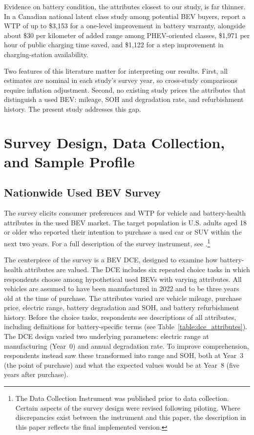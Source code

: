 \documentclass[a4paper,fleqn]{cas-sc}   %
\begin{document}
Evidence on battery condition, the attributes closest to our study, is far thinner. In a Canadian national latent class study among potential BEV buyers, \textcite{fergusonHowOpenAre2018} report a WTP of up to \$3,153 for a one-level improvement in battery warranty, alongside about \$30 per kilometer of added range among PHEV-oriented classes, \$1,971 per hour of public charging time saved, and \$1,122 for a step improvement in charging-station availability.

Two features of this literature matter for interpreting our results. First, all estimates are nominal in each study's survey year, so cross-study comparisons require inflation adjustment. Second, no existing study prices the attributes that distinguish a used BEV: mileage, SOH and degradation rate, and refurbishment history. The present study addresses this gap.



\section{Survey Design, Data Collection, and Sample Profile}
\label{section:data}
\subsection{Nationwide Used BEV Survey}

The survey elicits consumer preferences and WTP for vehicle and battery-health attributes in the used BEV market. The target population is U.S. adults aged 18 or older who reported their intention to purchase a used car or SUV within the next two years. For a full description of the survey instrument, see \textcite{goreDCIConsumerValuation2025}.\footnote{The Data Collection Instrument was published prior to data collection. Certain aspects of the survey design were revised following piloting. Where discrepancies exist between the instrument and this paper, the description in this paper reflects the final implemented version.}

The centerpiece of the survey is a BEV DCE, designed to examine how battery-health attributes are valued. The DCE includes six repeated choice tasks in which respondents choose among hypothetical used BEVs with varying attributes. All vehicles are assumed to have been manufactured in 2022 and to be three years old at the time of purchase. The attributes varied are vehicle mileage, purchase price, electric range, battery degradation and SOH, and battery refurbishment history. Before the choice tasks, respondents see descriptions of all attributes, including definitions for battery-specific terms (see Table~\ref{table:dce_attributes}). The DCE design varied two underlying parameters: electric range at manufacturing (Year~0) and annual degradation rate. To improve comprehension, respondents instead saw these transformed into range and SOH, both at Year~3 (the point of purchase) and what the expected values would be at Year~8 (five years after purchase).
\end{document}
